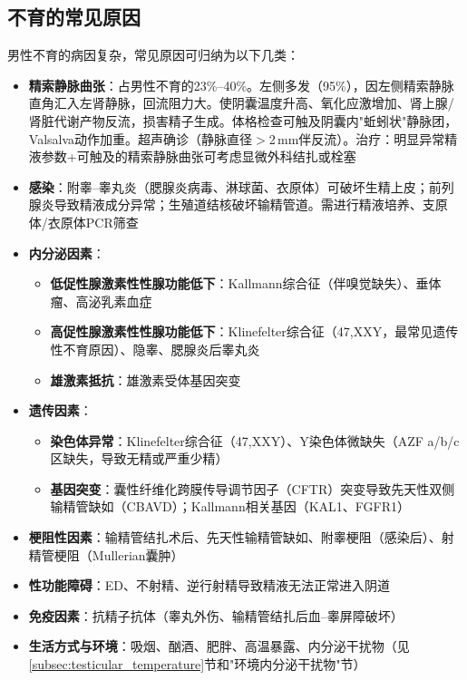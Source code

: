 \documentclass[12pt,a4paper,twoside]{ctexbook}
\begin{document}
\subsection{不育的常见原因}

男性不育的病因复杂，常见原因可归纳为以下几类：

\begin{itemize}[leftmargin=2cm]
	\item \textbf{精索静脉曲张}：占男性不育的23\%--40\%。左侧多发（95\%），因左侧精索静脉直角汇入左肾静脉，回流阻力大。使阴囊温度升高、氧化应激增加、肾上腺/肾脏代谢产物反流，损害精子生成。体格检查可触及阴囊内"蚯蚓状"静脉团，Valsalva动作加重。超声确诊（静脉直径$>$2\,mm伴反流）。治疗：明显异常精液参数+可触及的精索静脉曲张可考虑显微外科结扎或栓塞
	\item \textbf{感染}：附睾--睾丸炎（腮腺炎病毒、淋球菌、衣原体）可破坏生精上皮；前列腺炎导致精液成分异常；生殖道结核破坏输精管道。需进行精液培养、支原体/衣原体PCR筛查
	\item \textbf{内分泌因素}：
    \begin{itemize}
    	\item \textbf{低促性腺激素性性腺功能低下}：Kallmann综合征（伴嗅觉缺失）、垂体瘤、高泌乳素血症
    	\item \textbf{高促性腺激素性性腺功能低下}：Klinefelter综合征（47,XXY，最常见遗传性不育原因）、隐睾、腮腺炎后睾丸炎
    	\item \textbf{雄激素抵抗}：雄激素受体基因突变
    \end{itemize}
	\item \textbf{遗传因素}：
    \begin{itemize}
    	\item \textbf{染色体异常}：Klinefelter综合征（47,XXY）、Y染色体微缺失（AZF a/b/c区缺失，导致无精或严重少精）
    	\item \textbf{基因突变}：囊性纤维化跨膜传导调节因子（CFTR）突变导致先天性双侧输精管缺如（CBAVD）；Kallmann相关基因（KAL1、FGFR1）
    \end{itemize}
	\item \textbf{梗阻性因素}：输精管结扎术后、先天性输精管缺如、附睾梗阻（感染后）、射精管梗阻（Mullerian囊肿）
	\item \textbf{性功能障碍}：ED、不射精、逆行射精导致精液无法正常进入阴道
	\item \textbf{免疫因素}：抗精子抗体（睾丸外伤、输精管结扎后血--睾屏障破坏）
	\item \textbf{生活方式与环境}：吸烟、酗酒、肥胖、高温暴露、内分泌干扰物（见\ref{subsec:testicular_temperature}节和"环境内分泌干扰物"节）
\end{itemize}
\end{document}
